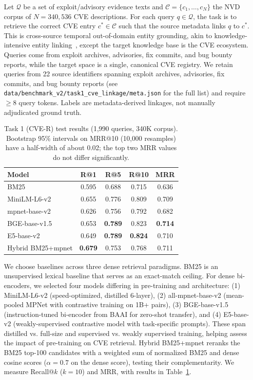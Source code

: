 \documentclass{article}
\begin{document}
Let $\mathcal{Q}$ be a set of exploit/advisory evidence texts and $\mathcal{C} = \{c_1, \ldots, c_N\}$ the NVD corpus of $N{=}340{,}536$ CVE descriptions. For each query $q \in \mathcal{Q}$, the task is to retrieve the correct CVE entry $c^* \in \mathcal{C}$ such that the source metadata links $q$ to $c^*$. This is cross-source temporal out-of-domain entity grounding, akin to knowledge-intensive entity linking~\citep{petroni2021kilt}, except the target knowledge base is the CVE ecosystem. Queries come from exploit archives, advisories, fix commits, and bug bounty reports, while the target space is a single, canonical CVE registry. We retain queries from 22 source identifiers spanning exploit archives, advisories, fix commits, and bug bounty reports (see \texttt{data/benchmark\_v2/task1\_cve\_linkage/meta.json} for the full list) and require $\geq$8 query tokens. Labels are metadata-derived linkages, not manually adjudicated ground truth. 

\begin{table}
\vspace{-4pt}
\centering
\small
\setlength{\tabcolsep}{3pt}
\caption{Task 1 (CVE-R) test results (1,990 queries, 340K corpus). Bootstrap 95\% intervals on MRR@10 (10,000 resamples) have a half-width of about 0.02; the top two MRR values do not differ significantly.}
\label{tab:task1-results}
\begin{tabular}{lcccc}
\toprule
\textbf{Model} & \textbf{R@1} & \textbf{R@5} & \textbf{R@10} & \textbf{MRR} \\
\midrule
BM25 & 0.595 & 0.688 & 0.715 & 0.636 \\
MiniLM-L6-v2 & 0.655 & 0.776 & 0.809 & 0.709 \\
mpnet-base-v2 & 0.626 & 0.756 & 0.792 & 0.682 \\
BGE-base-v1.5 & 0.653 & \textbf{0.789} & 0.823 & \textbf{0.714} \\
E5-base-v2 & 0.649 & \textbf{0.789} & \textbf{0.824} & 0.710 \\
\midrule
Hybrid BM25+mpnet & \textbf{0.679} & 0.753 & 0.768 & 0.711 \\
\bottomrule
\end{tabular}
\vspace{-4pt}
\end{table}

We choose baselines across three dense retrieval paradigms. BM25 is an unsupervised lexical baseline that serves as an exact-match ceiling. For dense bi-encoders, we selected four models differing in pre-training and architecture: (1) MiniLM-L6-v2 (speed-optimized, distilled 6-layer), (2) all-mpnet-base-v2 (mean-pooled MPNet with contrastive training on 1B+ pairs), (3) BGE-base-v1.5 (instruction-tuned bi-encoder from BAAI for zero-shot transfer), and (4) E5-base-v2 (weakly-supervised contrastive model with task-specific prompts). These span distilled vs. full-size and supervised vs. weakly supervised training, helping assess the impact of pre-training on CVE retrieval. Hybrid BM25+mpnet reranks the BM25 top-100 candidates with a weighted sum of normalized BM25 and dense cosine scores ($\alpha{=}0.7$ on the dense score), testing their complementarity. We measure Recall@$k$ ($ k= {10}$) and MRR, with results in Table~\ref{tab:task1-results}.
\end{document}
